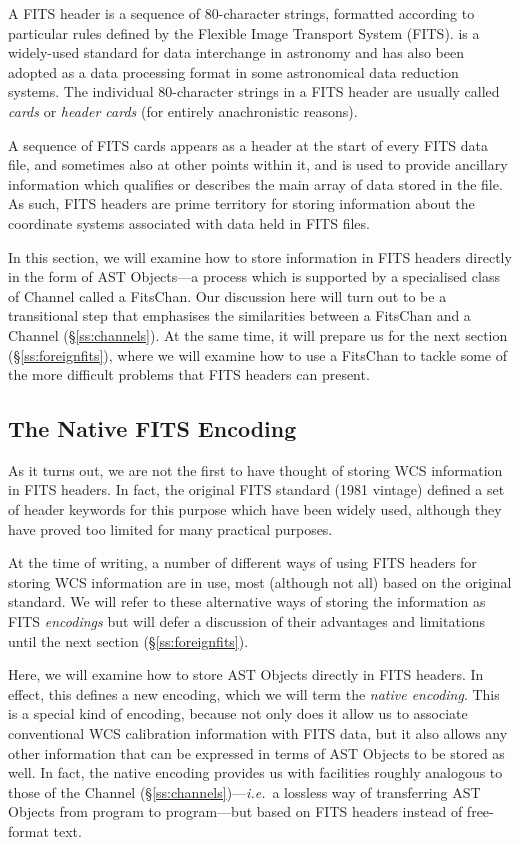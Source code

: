 \documentclass[twoside,11pt]{starlink}
\providecommand{\secref}[1]{\S\ref{#1}}
\begin{document}
{A FITS header is a sequence of 80-character strings, formatted
according to particular rules defined by the Flexible Image Transport
System
(FITS). 
is a widely-used standard for data interchange in astronomy and has
also been adopted as a data processing format in some astronomical
data reduction systems.  The individual 80-character strings in a FITS
header are usually called \emph{cards} or \emph{header cards} (for
entirely anachronistic reasons).

A sequence of FITS cards appears as a header at the start of every
FITS data file, and sometimes also at other points within it, and is
used to provide ancillary information which qualifies or describes the
main array of data stored in the file. As such, FITS headers are prime
territory for storing information about the coordinate systems
associated with data held in FITS files.

In this section, we will examine how to store information in FITS
headers directly in the form of AST Objects---a process which is
supported by a specialised class of Channel called a FitsChan. Our
discussion here will turn out to be a transitional step that
emphasises the similarities between a FitsChan and a Channel
(\secref{ss:channels}). At the same time, it will prepare us for the
next section (\secref{ss:foreignfits}), where we will examine how to
use a FitsChan to tackle some of the more difficult problems that FITS
headers can present.

\subsection{\label{ss:nativeencoding}The Native FITS Encoding}

As it turns out, we are not the first to have thought of storing WCS
information in FITS headers. In fact, the original FITS standard (1981
vintage) defined a set of header keywords for this purpose which have
been widely used, although they have proved too limited for many
practical purposes.

At the time of writing, a number of different ways of using FITS
headers for storing WCS information are in use, most (although not
all) based on the original standard. We will refer to these
alternative ways of storing the information as FITS \emph{encodings}
but will defer a discussion of their advantages and limitations until
the next section (\secref{ss:foreignfits}).

Here, we will examine how to store AST Objects directly in FITS
headers. In effect, this defines a new encoding, which we will term
the \emph{native encoding}. This is a special kind of encoding,
because not only does it allow us to associate conventional
WCS calibration information with FITS data, but it also allows any other
information that can be expressed in terms of AST Objects to be stored
as well.  In fact, the native encoding provides us with facilities
roughly analogous to those of the Channel
(\secref{ss:channels})---\emph{i.e.}\ a lossless way of
transferring AST Objects from program to program---but based on FITS
headers instead of free-format text.

}
\end{document}
